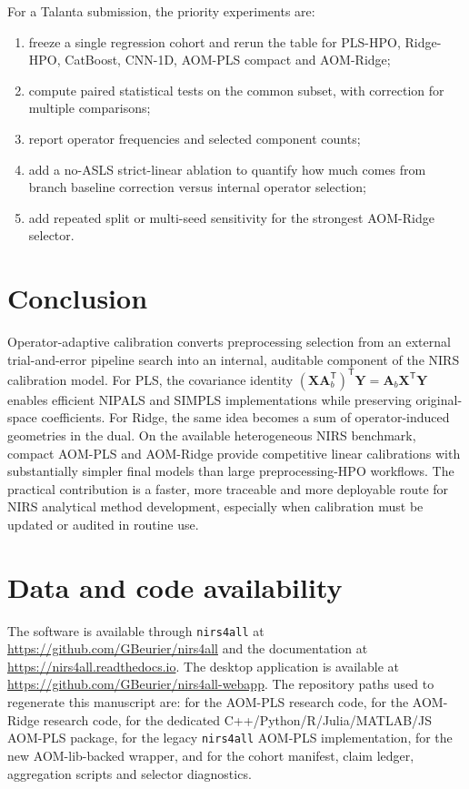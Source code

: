 \documentclass[11pt,a4paper]{article}
\newcommand{\X}{\mathbf{X}}
\newcommand{\Y}{\mathbf{Y}}
\newcommand{\A}{\mathbf{A}}
\newcommand{\transpose}{^{\mathsf T}}
\begin{document}
For a Talanta submission, the priority experiments are:
\begin{enumerate}
  \item freeze a single regression cohort and rerun the table for PLS-HPO,
  Ridge-HPO, CatBoost, CNN-1D, AOM-PLS compact and AOM-Ridge;
  \item compute paired statistical tests on the common subset, with correction
  for multiple comparisons;
  \item report operator frequencies and selected component counts;
  \item add a no-ASLS strict-linear ablation to quantify how much comes from
  branch baseline correction versus internal operator selection;
  \item add repeated split or multi-seed sensitivity for the strongest
  AOM-Ridge selector.
\end{enumerate}

\section{Conclusion}

Operator-adaptive calibration converts preprocessing selection from an external
trial-and-error pipeline search into an internal, auditable component of the
NIRS calibration model.  For PLS, the covariance identity
$(\X\A_b\transpose)\transpose\Y=\A_b\X\transpose\Y$ enables efficient NIPALS
and SIMPLS implementations while preserving original-space coefficients.  For
Ridge, the same idea becomes a sum of operator-induced geometries in the dual.
On the available heterogeneous NIRS benchmark, compact AOM-PLS and AOM-Ridge
provide competitive linear calibrations with substantially simpler final
models than large preprocessing-HPO workflows.  The practical contribution is
a faster, more traceable and more deployable route for NIRS analytical method
development, especially when calibration must be updated or audited in routine
use.

\section*{Data and code availability}

The software is available through \texttt{nirs4all} at
\url{https://github.com/GBeurier/nirs4all} and the documentation at
\url{https://nirs4all.readthedocs.io}.  The desktop application is available at
\url{https://github.com/GBeurier/nirs4all-webapp}.  The repository paths used
to regenerate this manuscript are:  for the AOM-PLS
research code,  for the AOM-Ridge research code,
 for the dedicated C++/Python/R/Julia/MATLAB/JS AOM-PLS
package,  for the legacy
\texttt{nirs4all} AOM-PLS implementation,
 for the new
AOM-lib-backed wrapper, and  for the cohort manifest,
claim ledger, aggregation scripts and selector diagnostics.
\end{document}
